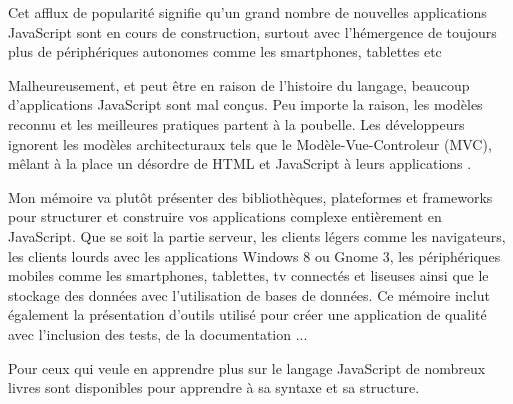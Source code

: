 Cet afflux de popularité signifie qu’un grand nombre de nouvelles applications JavaScript sont en cours de construction, surtout avec l’hémergence de toujours plus de périphériques autonomes comme les smartphones, tablettes etc

Malheureusement, et peut être en raison de l’histoire du langage, beaucoup d’applications JavaScript sont mal conçus. Peu importe la raison, les modèles reconnu et les meilleures pratiques partent à la poubelle. Les développeurs ignorent les modèles architecturaux tels que le Modèle-Vue-Controleur (MVC), mêlant à la place un désordre de HTML et JavaScript à leurs applications .

Mon mémoire va plutôt présenter des bibliothèques, plateformes et frameworks pour structurer et construire vos applications complexe entièrement en JavaScript. Que se soit  la partie serveur, les clients légers comme les navigateurs, les clients lourds avec les applications Windows 8 ou Gnome 3, les périphériques mobiles comme les smartphones, tablettes, tv connectés et liseuses ainsi que le stockage des données avec l’utilisation de bases de données. Ce mémoire inclut également la présentation d'outils utilisé pour créer une application de qualité avec l’inclusion des tests, de la documentation ...

Pour ceux qui veule en apprendre plus sur le langage JavaScript de nombreux livres sont disponibles pour apprendre à sa syntaxe et sa structure. 

